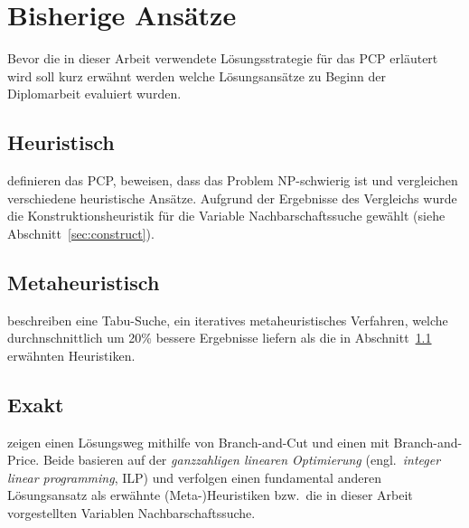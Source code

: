 \section{Bisherige Ansätze}
Bevor die in dieser Arbeit verwendete Lösungsstrategie für das PCP erläutert wird soll kurz erwähnt werden welche Lösungsansätze zu Beginn der Diplomarbeit evaluiert wurden.

\subsection{Heuristisch}
\label{sec:li2000}
\citet*{Li2000} definieren das PCP, beweisen, dass das Problem NP-schwierig ist und vergleichen verschiedene heuristische Ansätze. Aufgrund der Ergebnisse des Vergleichs wurde die Konstruktionsheuristik für die Variable Nachbarschaftssuche gewählt (sie\-he Abschnitt~\ref{sec:construct}).

\subsection{Metaheuristisch}
\label{sec:tabu}
\citet*{Noronha2006} beschreiben eine Tabu-Suche, ein iteratives metaheuristisches Verfahren, welche durchnschnittlich um 20\% bessere Ergebnisse liefern als die in Abschnitt~\ref{sec:li2000} erwähnten Heuristiken.

\subsection{Exakt}
\citet*{Frota2010} zeigen einen Lösungsweg mithilfe von Branch-and-Cut und \citet*{Hoshino2011} einen mit Branch-and-Price. Beide basieren auf der \textit{ganzzahligen linearen Optimierung} (engl.\ \textit{integer linear programming}, ILP) und verfolgen einen fundamental anderen Lösungsansatz als erwähnte (Meta-)Heuristiken bzw.\ die in dieser Arbeit vorgestellten Variablen Nachbarschaftssuche.
